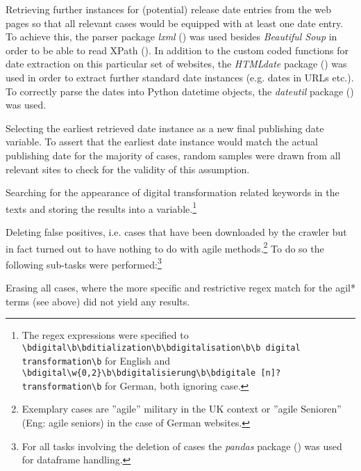 \begin{compactitem}
\item Retrieving further instances for (potential) release date entries from the web pages so that all relevant cases would be equipped with at least one date entry. To achieve this, the parser package \textit{lxml} (\cite{Faassen2006}) was used besides \textit{Beautiful Soup} in order to be able to read XPath (\cite{Clark1999}). In addition to the custom coded functions for date extraction on this particular set of websites, the \textit{HTMLdate} package (\cite{Barbaresi2020}) was used in order to extract further standard date instances (e.g. dates in URLs etc.). To correctly parse the dates into Python datetime objects, the \textit{dateutil} package (\cite{Niemeyer2003}) was used.
\item Selecting the earliest retrieved date instance as a new final publishing date variable. To assert that the earliest date instance would match the actual publishing date for the majority of cases, random samples were drawn from all relevant sites to check for the validity of this assumption. 
\item Searching for the appearance of digital transformation related keywords in the texts and storing the results into a variable.\footnote{The regex expressions were specified to \texttt{\textbackslash bdigital\textbackslash b\textbar \textbackslash bditialization\textbackslash b\textbar \textbackslash bdigitalisation\textbackslash b\textbar \textbackslash b digital transformation\textbackslash b} for English and \texttt{\textbackslash bdigital\textbackslash w\{0,2\}\textbackslash b\textbar \textbackslash bdigitalisierung\textbackslash b\textbar \textbackslash bdigitale [n]? transformation\textbackslash b} for German, both ignoring case.}
\item Deleting false positives, i.e. cases that have been downloaded by the crawler but in fact turned out to have nothing to do with agile methods.\footnote{Exemplary cases are ”agile” military in the UK context or ”agile Senioren” (Eng: agile seniors) in the case of German websites.} To do so the following sub-tasks were performed:\footnote{For all tasks involving the deletion of cases the \textit{pandas} package (\cite{McKinney2010}) was used for dataframe handling.}
    \begin{compactitem}
    \item Erasing all cases, where the more specific and restrictive regex match for the agil* terms (see above) did not yield any results. 

\end{compactitem}
\end{compactitem}
